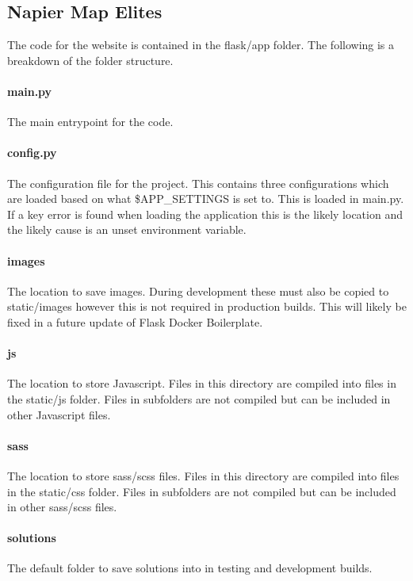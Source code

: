 \subsection{Napier Map Elites}

The code for the website is contained in the flask/app folder.  The following is a breakdown of the folder structure.

\paragraph{main.py}  The main entrypoint for the code.

\paragraph{config.py}  The configuration file for the project.  This contains three configurations which are loaded based on what \$APP\_SETTINGS is set to.  This is loaded in main.py.  If a key error is found when loading the application this is the likely location and the likely cause is an unset environment variable.

\paragraph{images}  The location to save images.  During development these must also be copied to static/images however this is not required in production builds.  This will likely be fixed in a future update of Flask Docker Boilerplate.

\paragraph{js}  The location to store Javascript.  Files in this directory are compiled into files in the static/js folder.  Files in subfolders are not compiled but can be included in other Javascript files.

\paragraph{sass}  The location to store sass/scss files.  Files in this directory are compiled into files in the static/css folder.  Files in subfolders are not compiled but can be included in other sass/scss files.

\paragraph{solutions}  The default folder to save solutions into in testing and development builds.

